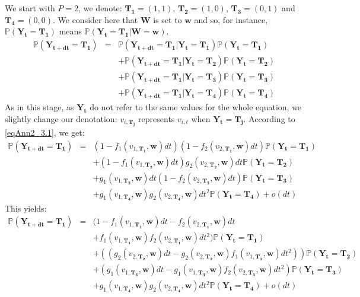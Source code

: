 We start with $P=2$, we denote: $\mathbf{T_1}=(1,1)$, $\mathbf{T_2}=(1,0)$, $\mathbf{T_3}=(0,1)$ and $\mathbf{T_4}=(0,0)$. We consider here that $\mathbf{W}$ is set to $\mathbf{w}$ and so, for instance, $\mathbb{P}(\mathbf{\mathbf{Y_t}}=\mathbf{T_1})$ means $\mathbb{P}(\mathbf{\mathbf{Y_t}}=\mathbf{T_1}|\mathbf{W}=\mathbf{w})$.
\begin{eqnarray}
\nonumber \mathbb{P}(\mathbf{Y_{t+dt}}=\mathbf{T_1}) &=& \mathbb{P}(\mathbf{Y_{t+dt}}=\mathbf{T_1}|\mathbf{Y_t}=\mathbf{T_1})\mathbb{P}(\mathbf{Y_t}=\mathbf{T_1}) \\
\nonumber & & +\mathbb{P}(\mathbf{Y_{t+dt}}=\mathbf{T_1}|\mathbf{Y_t}=\mathbf{T_2})\mathbb{P}(\mathbf{Y_t}=\mathbf{T_2}) \\
\nonumber & & + \mathbb{P}(\mathbf{Y_{t+dt}}=\mathbf{T_1}|\mathbf{Y_t}=\mathbf{T_3})\mathbb{P}(\mathbf{Y_t}=\mathbf{T_3}) \\
& & + \mathbb{P}(\mathbf{Y_{t+dt}}=\mathbf{T_1}|\mathbf{Y_t}=\mathbf{T_4})\mathbb{P}(\mathbf{Y_t}=\mathbf{T_4})
\label{eqAnn2_5.1}
\end{eqnarray}
As in this stage, as $\mathbf{Y_t}$ do not refer to the same values for the whole equation, we slightly change our denotation: $v_{i,\mathbf{T_j}}$ represents $v_{i,t}$ when $\mathbf{Y_t}=\mathbf{T_j}$. According to \eqref{eqAnn2_3.1}, we get:
\begin{eqnarray}
\label{eqAnn2_5.2} \nonumber  \mathbb{P}(\mathbf{Y_{t+dt}}=\mathbf{T_1})&=&(1-f_1(v_{1,\mathbf{T_1}},\mathbf{w})dt)(1-f_2(v_{2,\mathbf{T_1}},\mathbf{w})dt)\mathbb{P}(\mathbf{Y_t}=\mathbf{T_1})\\
\nonumber & & +(1-f_1(v_{1,\mathbf{T_2}},\mathbf{w})dt)g_2(v_{2,\mathbf{T_2}},\mathbf{w})dt \mathbb{P}(\mathbf{Y_t}=\mathbf{T_2}) \\
\nonumber & & +g_1(v_{1,\mathbf{T_3}},\mathbf{w})dt(1-f_2(v_{2,\mathbf{T_3}},\mathbf{w})dt)\mathbb{P}(\mathbf{Y_t}=\mathbf{T_3}) \\
\label{eqAnn2_5.2} & & +g_1(v_{1,\mathbf{T_4}},\mathbf{w})g_2(v_{2,\mathbf{T_4}},\mathbf{w})dt^2\mathbb{P}(\mathbf{Y_t}=\mathbf{T_4}) +o(dt)
\end{eqnarray}
This yields:
\begin{eqnarray}
\label{eqAnn2_5.3} \nonumber \mathbb{P}(\mathbf{Y_{t+dt}}=\mathbf{T_1})&=&(1-f_1(v_{1,\mathbf{T_1}},\mathbf{w})dt-f_2(v_{2,\mathbf{T_1}},\mathbf{w})dt \\
\nonumber & & +f_1(v_{1,\mathbf{T_1}},\mathbf{w})f_2(v_{2,\mathbf{T_1}},\mathbf{w})dt^2)\mathbb{P}(\mathbf{Y_t}=\mathbf{T_1})\\
\nonumber & & +((g_2(v_{2,\mathbf{T_2}},\mathbf{w})dt-g_2(v_{2,\mathbf{T_2}},\mathbf{w})f_1(v_{1,\mathbf{T_2}},\mathbf{w})dt^2))\mathbb{P}(\mathbf{Y_t}=\mathbf{T_2}) \\
\nonumber & & +(g_1(v_{1,\mathbf{T_3}},\mathbf{w})dt-g_1(v_{1,\mathbf{T_3}},\mathbf{w})f_2(v_{2,\mathbf{T_3}},\mathbf{w})dt^2)\mathbb{P}(\mathbf{Y_t}=\mathbf{T_3}) \\
& & +g_1(v_{1,\mathbf{T_4}},\mathbf{w})g_2(v_{2,\mathbf{T_4}},\mathbf{w})dt^2\mathbb{P}(\mathbf{Y_t}=\mathbf{T_4})+o(dt)
\end{eqnarray}
